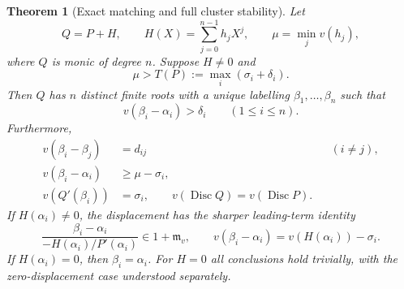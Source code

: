 \documentclass[11pt,letterpaper]{article}
\numberwithin{equation}{section}
\newtheorem{theorem}{Theorem}[section]
\theoremstyle{definition}
\theoremstyle{remark}
\newcommand{\mv}{\mathfrak m_v}
\newcommand{\Disc}{\operatorname{Disc}}
\begin{document}
\begin{theorem}[Exact matching and full cluster stability]\label{thm:stability}
Let
\[
 Q=P+H,\qquad H(X)=\sum_{j=0}^{n-1}h_jX^j,
 \qquad \mu=\min_jv(h_j),
\]
where $Q$ is monic of degree $n$. Suppose $H\ne0$ and
\begin{equation}\label{eq:stabilitythreshold}
 \mu>T(P):=\max_i(\sigma_i+\delta_i).
\end{equation}
Then $Q$ has $n$ distinct finite roots with a unique labelling
$\beta_1,\ldots,\beta_n$ such that
\begin{equation}\label{eq:matchingballs}
 v(\beta_i-\alpha_i)>\delta_i\qquad(1\le i\le n).
\end{equation}
Furthermore,
\begin{align}
 v(\beta_i-\beta_j)&=d_{ij} &&(i\ne j),\label{eq:pairwisepreserved}\\
 v(\beta_i-\alpha_i)&\ge\mu-\sigma_i,\label{eq:shiftbound}\\
 v(Q'(\beta_i))&=\sigma_i,\qquad
 v(\Disc Q)=v(\Disc P).\label{eq:discpreserved}
\end{align}
If $H(\alpha_i)\ne0$, the displacement has the sharper leading-term
identity
\begin{equation}\label{eq:leadingdisplacement}
 \frac{\beta_i-\alpha_i}{-H(\alpha_i)/P'(\alpha_i)}\in1+\mv,
 \qquad
 v(\beta_i-\alpha_i)=v(H(\alpha_i))-\sigma_i.
\end{equation}
If $H(\alpha_i)=0$, then $\beta_i=\alpha_i$. For $H=0$ all conclusions
hold trivially, with the zero-displacement case understood separately.
\end{theorem}
\end{document}

